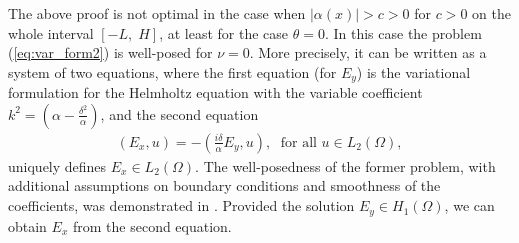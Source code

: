 \begin{remark} 
\label{remark:other}
The above proof is not optimal in the case when $\left|\alpha(x)\right|>c>0$ for $c>0$ on the whole interval $[-L,\; H]$, at least 
for the case $\theta=0$. In this case the problem (\ref{eq:var_form2}) is well-posed for $\nu=0$. More precisely, it can be written 
as a system of two equations, where the first equation (for $E_y$) is the variational formulation for the Helmholtz equation 
with the variable coefficient $k^2=(\alpha-\frac{\delta^2}{\alpha})$, and the second equation 
\begin{align*}
  \left(E_x,u\right)=-\left(\frac{i\delta}{\alpha}E_y,u\right),\; \text{ for all } u\in L_{2}(\Omega), 
\end{align*}
uniquely defines $E_x\in L_{2}(\Omega)$. The well-posedness of the former problem, with additional assumptions on boundary conditions and smoothness of the coefficients, 
was demonstrated in \cite{LMIG_thesis}. Provided the solution $E_y\in H_{1}(\Omega)$, we can obtain $E_x$ from the second equation.



\end{remark}

